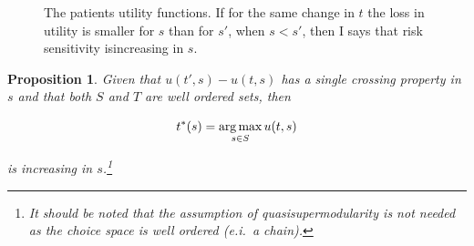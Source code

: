 \documentclass[10pt,a4paper]{article} %
\newtheorem{prop}[thm]{Proposition}
\theoremstyle{definition}
\theoremstyle{remark}
\begin{document}
\begin{figure}

\caption{\label{fig:The-patients-utility}The patients utility functions. If for the same change in $t$ the loss in utility is smaller for $s$ than for $s'$, when $s<s'$, then I says that risk sensitivity isincreasing in $s$.}
\end{figure}

\begin{prop}
Given that $u(t',s)-u(t,s)$ has a single crossing property in $s$
and that both $S$ and $T$ are well ordered sets, then

\[
t^{*}(s)=\argmax_{s\in S}u(t,s)
\]

is increasing in $s$.\footnote{It should be noted that the assumption of quasisupermodularity is
not needed as the choice space is well ordered (e.i.\ a chain). %
}
\end{prop}
\end{document}
